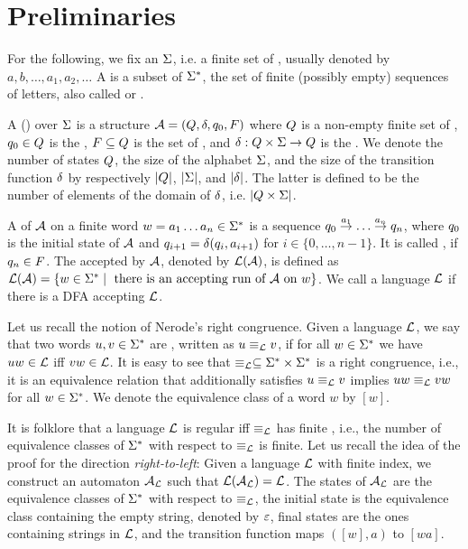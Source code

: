 \section{Preliminaries}

For the following, we fix an  $\Sigma$, i.e. a finite
set of , usually denoted by $a,b,\dots,a_1,a_2,\dots$ A
 is a subset of $\Sigma^\ast$, the set of finite
(possibly empty) sequences of letters, also called  or
.

A  () over
$\Sigma$ is a structure ${\cal A}=(Q,\delta,q_0,F)$
where $Q$ is a non-empty finite set of , $q_0
\in Q$ is the , $F \subseteq Q$ is
the set of , and $\delta : Q \times \Sigma
\to Q$ is the . We denote the number of
states $Q$, the size of the alphabet $\Sigma$, and the size
of the transition function $\delta$ by respectively $|Q|$,
$|\Sigma|$, and $|\delta|$. The latter is defined to be the number
of elements of the domain of $\delta$, i.e. $|Q \times
\Sigma|$.

A  of ${\cal A}$ on a finite word $w=a_1\dots a_n \in
\Sigma^\ast$ is a sequence $q_0 \stackrel{a_1}{\to} \dots
\stackrel{a_n}{\to} q_n$, where $q_0$ is the initial state of ${\cal A}$
and $q_{i+1} = \delta(q_i, a_{i+1})$ for $i \in \{ 0, \dots, n-1 \}$.
It is called , if $q_n \in F$. The 
accepted by ${\cal A}$, denoted by $\mathcal{L}({\cal A})$, is defined as
$\mathcal{L}({\cal A})=\{ w \in \Sigma^\ast \mid \mbox{ there is an
  accepting run of } {\cal A} \mbox{ on } w\}$. We call a language
$\mathcal{L}$  if there is a DFA accepting $\mathcal{L}$.

Let us recall the notion of Nerode's right congruence. Given a
language $\mathcal{L}$, we say that two words $u, v \in \Sigma^\ast$ are
, written as $u \equiv_{\mathcal{L}} v$, if for all $w \in
\Sigma^\ast$ we have $uw \in \mathcal{L}$ iff $vw \in \mathcal{L}$. It is easy
to see that $\equiv_{\mathcal{L}} \subseteq \Sigma^\ast \times \Sigma^\ast$ is
a right congruence, i.e., it is an equivalence relation that
additionally satisfies $u \equiv_{\mathcal{L}}
v$ implies $uw \equiv_{\mathcal{L}} vw$ for all $w
\in \Sigma^\ast$. We denote the equivalence class of a word $w$ by
$[w]$.

It is folklore that a language $\mathcal{L}$ is regular iff $\equiv_{\mathcal{L}}$
has finite , i.e., the number of equivalence classes of
$\Sigma^\ast$ with respect to $\equiv_{\mathcal{L}}$ is finite.  Let us
recall the idea of the proof for the direction \emph{right-to-left}:
Given a language $\mathcal{L}$ with finite index, we construct an automaton
${\cal A}_{\mathcal{L}}$ such that $\mathcal{L}({\cal A}_{\mathcal{L}}) = \mathcal{L}$. The states of
${\cal A}_{\mathcal{L}}$ are the equivalence classes of $\Sigma^\ast$ with
respect to $\equiv_{\mathcal{L}}$, the initial state is the equivalence
class containing the empty string, denoted by $\varepsilon$, final
states are the ones containing strings in $\mathcal{L}$, and the transition
function maps $([w],a)$ to $[wa]$.

